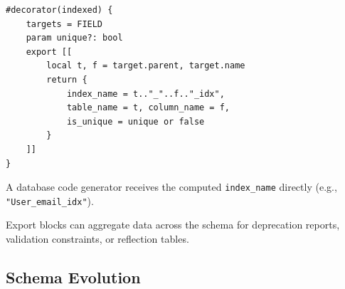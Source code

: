 \documentclass[11pt,onecolumn]{article}
\begin{document}
\begin{minipage}{\textwidth}
\vspace{4pt}
\begin{minipage}[t]{0.58\textwidth}
\begin{lstlisting}[language=bebop,basicstyle=\ttfamily\footnotesize]
#decorator(indexed) {
    targets = FIELD
    param unique?: bool
    export [[
        local t, f = target.parent, target.name
        return {
            index_name = t.."_"..f.."_idx",
            table_name = t, column_name = f,
            is_unique = unique or false
        }
    ]]
}
\end{lstlisting}
\end{minipage}\hfill
\begin{minipage}[t]{0.38\textwidth}
\small
\raggedright
A database code generator receives the computed \texttt{index\_name} directly (e.g., \texttt{"User\_email\_idx"}).

\vspace{4pt}
Export blocks can aggregate data across the schema for deprecation reports, validation constraints, or reflection tables.
\end{minipage}
\end{minipage}

\subsection{Schema Evolution}
\label{sec:evolution}
\end{document}
